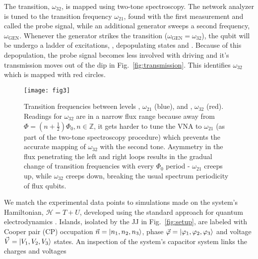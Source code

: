 The  \ilra{}   transition,  $\omega_{32}$,  is  mapped   using  two-tone
spectroscopy.   The  network  analyzer  is  tuned  to  the  transition  frequency
$ \omega_{21} $, found  with the first measurement and called  the probe signal, while
an additional generator sweeps a  second frequency, $ \omega_{\text{GEN}} $.  Whenever
the      generator      strikes     the      \ira{}      transition
($\omega_{\text{GEN}} = \omega_{32} $), the qubit  will be undergo a ladder of excitations,
      ,  depopulating
states   and .   Because of this  depopulation, the  probe signal
becomes less involved with driving and it's  transmission moves out of the dip in
Fig.~\ref{fig:transmission}.  This  identifies $\omega_{32}$ which is  mapped with red
circles.



\begin{figure}[h]
  \texttt{[image: fig3]}
  \caption{\small Transition  frequencies between levels  \ilra {},
    $ \omega_{21}  $ (blue), and   \ilra {}, $  \omega_{32}$ (red).
    Readings for  $ \omega_{32} $  are in a narrow  flux range because  away from
    $ \Phi  = (n + \frac{1}{2})\Phi_0,  n\in\mathbb{Z} $, it gets  harder to tune
    the VNA to  $ \omega_{21} $ (as part of  the two-tone spectroscopy procedure)
    which prevents the accurate mapping of  $ \omega_{32} $ with the second tone.
    Asymmetry in  the flux penetrating  the left and  right loops results  in the
    gradual change  of transition frequencies  with every  $ \Phi_{0} $  period -
    $\omega_{21}$ creeps up, while $\omega_{32}$  creeps down, breaking the usual
    spectrum periodicity of flux qubits.}
  \label{fig:experiment}
\end{figure}

We  match the  experimental  data  points to  simulations  made  on the  system's
Hamiltonian, $ \mathcal{H} =  T + U $, developed using  the standard approach for
quantum  electrodynamics  \cite{orlando1999}.  Islands,  isolated  by  the JJ  in
Fig.~\ref{fig:setup},   are   labeled   with    Cooper   pair   (CP)   occupation
$       \vec{n}      =       \Ket{n_1,       n_2,       n_3}      $,       phase
$     \vec{\varphi}      =     \Ket{\varphi_1,      \varphi_2,     \varphi_3}     $      and     voltage
$ \vec{V} =  \Ket{V_{1}, V_{2}, V_{3}} $ states.  An  inspection of the system's
capacitor system links the charges and voltages

